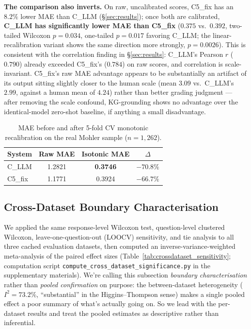 \documentclass[conference]{IEEEtran}
\begin{document}
\textbf{The comparison also inverts.} On raw, uncalibrated scores,
C5\_fix has an $8.2\%$ lower MAE than C\_LLM (\S\ref{sec:results});
once both are calibrated, \textbf{C\_LLM has significantly lower MAE
than C5\_fix} ($0.375$ vs.\ $0.392$, two-tailed Wilcoxon $p=0.034$,
one-tailed $p=0.017$ favoring C\_LLM; the linear-recalibration variant
shows the same direction more strongly, $p=0.0026$). This is
consistent with the correlation finding in \S\ref{sec:results}:
C\_LLM's Pearson $r$ ($0.790$) already exceeded C5\_fix's ($0.784$) on
raw scores, and correlation is scale-invariant. C5\_fix's raw MAE
advantage appears to be substantially an artifact of its output
sitting slightly closer to the human scale (mean $3.09$ vs.\ C\_LLM's
$2.99$, against a human mean of $4.24$) rather than better grading
judgment --- after removing the scale confound, KG-grounding shows no
advantage over the identical-model zero-shot baseline, if anything a
small disadvantage.

\begin{table}[t]
\caption{MAE before and after 5-fold CV monotonic recalibration on the
real Mohler sample ($n=1{,}262$).}
\label{tab:calibration}
\centering
\begin{tabular}{lccc}
\toprule
\textbf{System} & \textbf{Raw MAE} & \textbf{Isotonic MAE} & \textbf{$\Delta$} \\
\midrule
C\_LLM  & 1.2821 & \textbf{0.3746} & $-70.8\%$ \\
C5\_fix & 1.1771 & 0.3924 & $-66.7\%$ \\
\bottomrule
\end{tabular}
\end{table}

\subsection{Cross-Dataset Boundary Characterisation}
\label{subsec:crossdataset_sig}

We applied the same response-level Wilcoxon test, question-level
clustered Wilcoxon, leave-one-question-out (LOOCV) sensitivity, and
tie analysis to all three cached evaluation datasets, then computed an
inverse-variance-weighted meta-analysis of the paired effect sizes
(Table~\ref{tab:crossdataset_sensitivity}; computation script
\texttt{compute\_cross\_dataset\_significance.py} in the supplementary
materials). We're calling this
subsection \emph{boundary characterisation} rather than \emph{pooled
confirmation} on purpose: the between-dataset heterogeneity
($I^2 = 73.2\%$, ``substantial'' in the Higgins--Thompson sense) makes
a single pooled effect a poor summary of what's actually going on.
So we lead with the per-dataset results and treat the pooled
estimates as descriptive rather than inferential.
\end{document}
